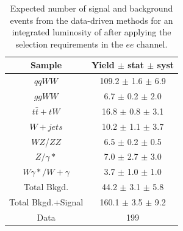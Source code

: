 \begin{table}[ht!]
  \begin{center}
  \begin{tabular} {|c|c|}
\hline
Sample                & Yield $\pm$ stat $\pm$ syst \\ \hline \hline
$qqWW$                & 109.2 $\pm$  1.6 $\pm$  6.9  \\ \hline
$ggWW$                &  6.7 $\pm$  0.2 $\pm$  2.0  \\ \hline
$t\bar{t} + tW$      & 16.8 $\pm$  0.8 $\pm$  3.1  \\ \hline
$W+jets$              & 10.2 $\pm$  1.1 $\pm$  3.7  \\ \hline
$WZ$/$ZZ$             &  6.5 $\pm$  0.2 $\pm$  0.5  \\ \hline
$Z/\gamma*$          &  7.0 $\pm$  2.7 $\pm$  3.0  \\ \hline
$W\gamma*/W+\gamma$ &  3.7 $\pm$  1.0 $\pm$  1.0  \\ \hline \hline
Total Bkgd.           & 44.2 $\pm$  3.1 $\pm$  5.8  \\ \hline \hline
Total Bkgd.+Signal    & 160.1 $\pm$  3.5 $\pm$  9.2  \\ \hline \hline
Data                  & 199 \\ \hline
\end{tabular}
  \caption{Expected number of signal and background events from the data-driven methods for
  an integrated luminosity of \intlumi after applying the selection requirements in the $ee$ channel.}
   \label{tab:data_yields_ee}
  \end{center}
\end{table}

